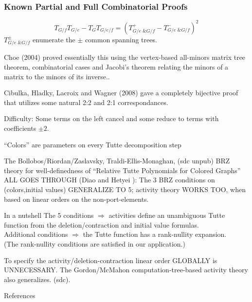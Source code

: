 \documentclass{beamer}
\newcommand{\Remph}[1]{{\color{red}#1}}
\begin{document}
\begin{frame}
\frametitle{Known Partial and Full Combinatorial Proofs}
\[
T_{G/f}T_{G/e} - T_GT_{G/e/f} = \left( T^+_{G/e \text{ \& } G/f} - T^-_{G/e \text{ \& } G/f} \right)^2
\]
$T^{\pm}_{G/e \text{ \& } G/f}$ enumerate the $\pm$ common spanning trees.

\vfill
Choe (2004) 
proved essentially this using the vertex-based all-minors matrix tree theorem,
combinatorial cases and Jacobi's theorem relating the minors of a matrix to
the minors of its inverse..

\vfill
Cibulka, Hladky, Lacroix and Wagner (2008) gave a completely bijective proof
that utilizes some natural 2:2 and 2:1 correspondances.

\vfill
\Remph{Difficulty:} Some terms on the left \Remph{cancel} and some
reduce to terms with coefficients $\pm 2$.
\vfill
\end{frame}



\begin{frame}{``Colors'' are parameters on every Tutte decomposition step}

The 
Bollobos/Riordan/Zaslavsky\cite{BollobasRiordanTuttePolyColored,MR93a:05047}, 
Traldi-Ellis-Monaghan\cite{DichWeighedGraphsTraldi89,Ellis-Monaghan-Traldi}, 
(sdc unpub)
BRZ theory for well-definedness
of ``Relative Tutte Polynomials for Colored Graphs'' ALL GOES THROUGH 
(Diao and Hetyei \cite{RelTuttePoly}):
The 3 BRZ conditions on (colors,initial values) GENERALIZE TO 5;
activity theory WORKS TOO, when
based on linear orders on the non-port-elements.

\begin{block}{In a nutshell}
The 5 conditions $\Longrightarrow$ activities define an 
unambiguous Tutte function 
from the deletion/contraction and initial value formulas.\\

Additional conditions $\Longrightarrow$ the Tutte function has a rank-nullity
expansion.\\

\Remph{
(The rank-nullity conditions are satisfied in our application.)}
\end{block}

\begin{block}{To specify the activity/deletion-contraction linear 
order GLOBALLY is 
UNNECESSARY.}
The Gordon/McMahon computation-tree-based 
activity theory also generalizes. (sdc).
\end{block}
\end{frame}


\begin{frame}[allowframebreaks]{References}

{}
\end{frame}


\end{document}
